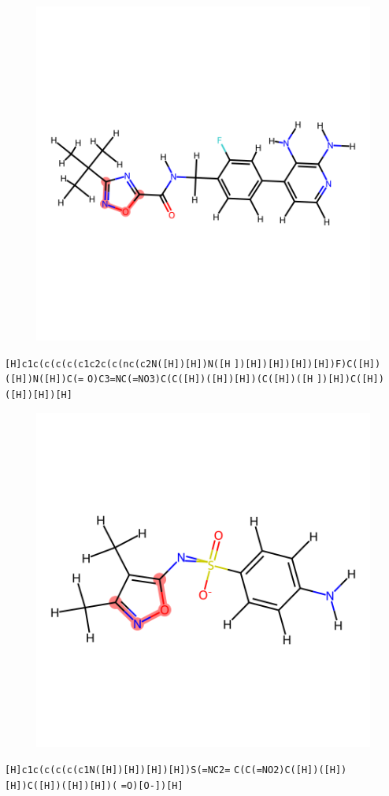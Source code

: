 \documentclass{article}
\begin{document}
\begin{figure}[ht]
\centering
    \includegraphics{mol134.png}
\end{figure}
\verb|[H]c1c(c(c(c(c1c2c(c(nc(c2N([H])[H])N([H| \verb|])[H])[H])[H])[H])F)C([H])([H])N([H])C(=| \verb|O)C3=NC(=NO3)C(C([H])([H])[H])(C([H])([H| \verb|])[H])C([H])([H])[H])[H]|

\begin{figure}[ht]
\centering
    \includegraphics{mol135.png}
\end{figure}
\verb|[H]c1c(c(c(c(c1N([H])[H])[H])[H])S(=NC2=| \verb|C(C(=NO2)C([H])([H])[H])C([H])([H])[H])(| \verb|=O)[O-])[H]|
\end{document}

